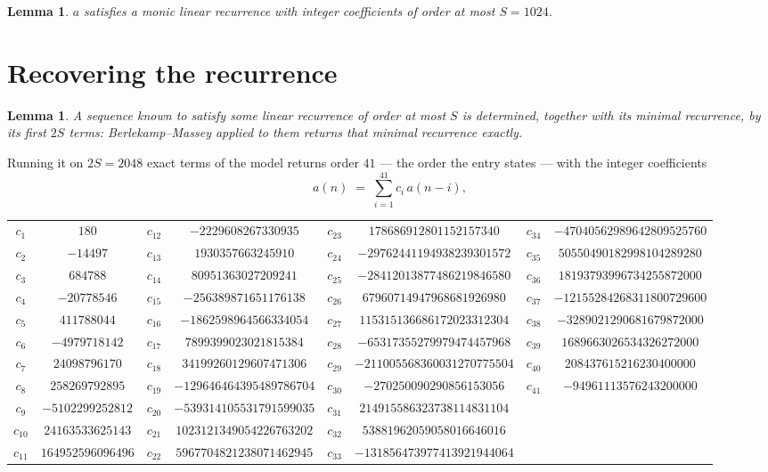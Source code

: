 \documentclass[11pt,a4paper]{article}
\theoremstyle{plain}
\newtheorem{lemma}[theorem]{Lemma}
\theoremstyle{definition}
\begin{document}
\begin{lemma}\label{lem:cf}
$a$ satisfies a monic linear recurrence with integer coefficients of order at most $S=1024$.
\end{lemma}

\section{Recovering the recurrence}

\begin{lemma}\label{lem:bm}
A sequence known to satisfy some linear recurrence of order at most $S$ is determined, together
with its minimal recurrence, by its first $2S$ terms: Berlekamp--Massey applied to them returns
that minimal recurrence exactly.
\end{lemma}

Running it on $2S=2048$ exact terms of the model returns order $41$ --- the order the
entry states --- with the integer coefficients
\[
a(n)\;=\;\sum_{i=1}^{41}c_i\,a(n-i),
\]
\begin{center}\small
\begin{tabular}{cccccccc}
$c_{1}$ & $180$ & $c_{12}$ & $-2229608267330935$ & $c_{23}$ & $178686912801152157340$ & $c_{34}$ & $-47040562989642809525760$ \\
$c_{2}$ & $-14497$ & $c_{13}$ & $1930357663245910$ & $c_{24}$ & $-29762441194938239301572$ & $c_{35}$ & $50550490182998104289280$ \\
$c_{3}$ & $684788$ & $c_{14}$ & $80951363027209241$ & $c_{25}$ & $-28412013877486219846580$ & $c_{36}$ & $18193793996734255872000$ \\
$c_{4}$ & $-20778546$ & $c_{15}$ & $-256389871651176138$ & $c_{26}$ & $67960714947968681926980$ & $c_{37}$ & $-12155284268311800729600$ \\
$c_{5}$ & $411788044$ & $c_{16}$ & $-1862598964566334054$ & $c_{27}$ & $115315136686172023312304$ & $c_{38}$ & $-3289021290681679872000$ \\
$c_{6}$ & $-4979718142$ & $c_{17}$ & $7899399023021815384$ & $c_{28}$ & $-65317355279979474457968$ & $c_{39}$ & $1689663026534326272000$ \\
$c_{7}$ & $24098796170$ & $c_{18}$ & $34199260129607471306$ & $c_{29}$ & $-211005568360031270775504$ & $c_{40}$ & $208437615216230400000$ \\
$c_{8}$ & $258269792895$ & $c_{19}$ & $-129646464395489786704$ & $c_{30}$ & $-270250090290856153056$ & $c_{41}$ & $-94961113576243200000$ \\
$c_{9}$ & $-5102299252812$ & $c_{20}$ & $-539314105531791599035$ & $c_{31}$ & $214915586323738114831104$ &  &  \\
$c_{10}$ & $24163533625143$ & $c_{21}$ & $1023121349054226763202$ & $c_{32}$ & $53881962059058016646016$ &  &  \\
$c_{11}$ & $164952596096496$ & $c_{22}$ & $5967704821238071462945$ & $c_{33}$ & $-131856473977413921944064$ &  &  \\
\end{tabular}
\end{center}
\end{document}
